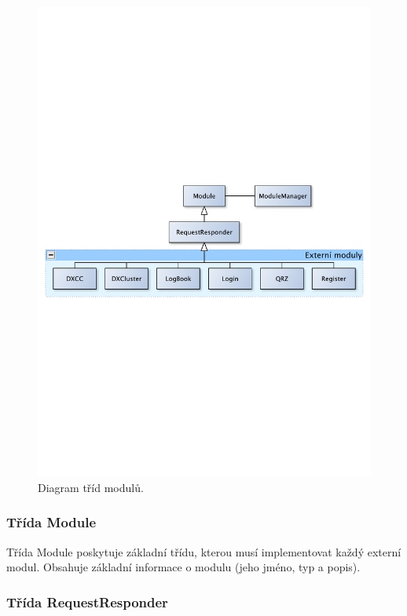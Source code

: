 \begin{figure}[h]
\centering
\includegraphics[trim=10cm 10cm 10cm 10cm, scale=0.7]{fig/moduly}
\caption{Diagram tříd modulů.}
\label{fig:moduly}
\end{figure}

\subsubsection{Třída Module}

Třída Module poskytuje základní třídu, kterou musí implementovat každý externí modul. Obsahuje základní informace o modulu 
(jeho jméno, typ a popis).

\subsubsection{Třída RequestResponder}

